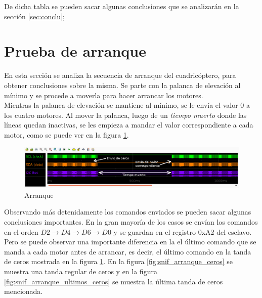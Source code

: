 \documentclass[main]{subfiles}
\begin{document}
De dicha tabla se pueden sacar algunas conclusiones que se analizarán en la sección \ref{sec:conclu};

\section{Prueba de arranque}
\label{sec:arranque}

En esta sección se analiza la secuencia de arranque del cuadricóptero, para obtener conclusiones sobre la misma. Se parte con la palanca de elevación al mínimo y se procede a moverla para hacer arrancar los motores.\\

Mientras la palanca de elevación se mantiene al mínimo, se le envía el valor 0 a los cuatro motores. Al mover la palanca, luego de un \emph{tiempo muerto} donde las líneas quedan inactivas, se les empieza a mandar el valor correspondiente a cada motor, como se puede ver en la figura \ref{fig:snif_arranque_lejos}.

\begin{figure}[h!]
	\centering
	\includegraphics[width=1\textwidth]{./pics_sniffer/snif_arranque_lejos.png}
	\caption{Arranque}
	\label{fig:snif_arranque_lejos}
\end{figure}

Observando más detenidamente los comandos enviados se pueden sacar algunas conclusiones importantes. En la gran mayoría de los casos se envían los comandos en el orden $D2\rightarrow D4\rightarrow D6\rightarrow D0$ y se guardan en el registro 0xA2 del esclavo. Pero se puede observar una importante diferencia en la el último comando que se manda a cada motor antes de arrancar, es decir, el último comando en la tanda de ceros mostrada en la figura \ref{fig:snif_arranque_lejos}. En la figura \ref{fig:snif_arranque_ceros} se muestra una tanda regular de ceros y en la figura \ref{fig:snif_arranque_ultimos_ceros} se muestra la última tanda de ceros mencionada.\\
\end{document}
